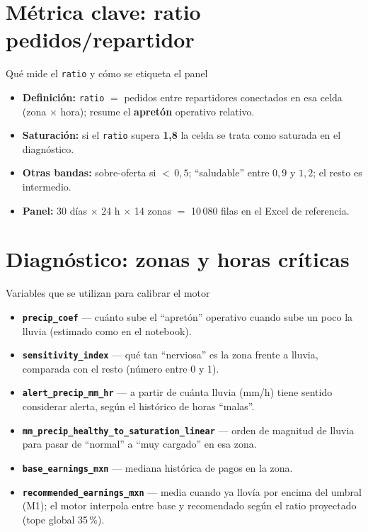 \documentclass[aspectratio=169,spanish]{beamer}
\begin{document}
\section{Métrica clave: ratio pedidos/repartidor}

\begin{frame}{Qué mide el \texttt{ratio} y cómo se etiqueta el panel}
  \begin{itemize}
    \item \textbf{Definición:} \texttt{ratio} $=$ pedidos entre repartidores conectados en esa celda (zona $\times$ hora); resume el \textbf{apretón} operativo relativo.
    \item \textbf{Saturación:} si el \texttt{ratio} supera \textbf{1{,}8} la celda se trata como saturada en el diagnóstico.
    \item \textbf{Otras bandas:} sobre-oferta si ${<}\,0{,}5$; ``saludable'' entre $0{,}9$ y $1{,}2$; el resto es intermedio.
    \item \textbf{Panel:} 30 días $\times$ 24 h $\times$ 14 zonas $=$ 10\,080 filas en el Excel de referencia.
  \end{itemize}
\end{frame}

\section{Diagnóstico: zonas y horas críticas}

\begin{frame}{Variables que se utilizan para calibrar el motor}
  \small
  \begin{itemize}
    \item \textbf{\texttt{precip\_coef}} — cuánto sube el ``apretón'' operativo cuando sube un poco la lluvia (estimado como en el notebook).
    \item \textbf{\texttt{sensitivity\_index}} — qué tan ``nerviosa'' es la zona frente a lluvia, comparada con el resto (número entre 0 y 1).
    \item \textbf{\texttt{alert\_precip\_mm\_hr}} — a partir de cuánta lluvia (mm/h) tiene sentido considerar alerta, según el histórico de horas ``malas''.
    \item \textbf{\texttt{mm\_precip\_healthy\_to\_saturation\_linear}} — orden de magnitud de lluvia para pasar de ``normal'' a ``muy cargado'' en esa zona.
    \item \textbf{\texttt{base\_earnings\_mxn}} — mediana histórica de pagos en la zona.
    \item \textbf{\texttt{recommended\_earnings\_mxn}} — media cuando ya llovía por encima del umbral (M1); el motor interpola entre base y recomendado según el ratio proyectado (tope global 35\,\%).
  \end{itemize}
\end{frame}
\end{document}
